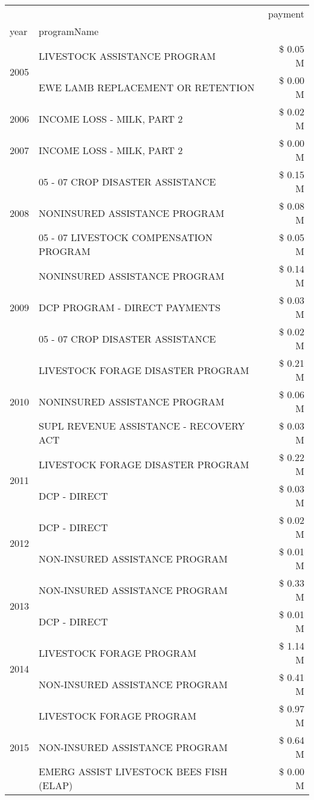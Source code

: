 \begin{tabular}{llr}
\toprule
 &  & payment \\
year & programName &  \\
\midrule
\multirow[t]{2}{*}{2005} & LIVESTOCK ASSISTANCE PROGRAM & \$ 0.05 M \\
 & EWE LAMB REPLACEMENT OR RETENTION & \$ 0.00 M \\
\cline{1-3}
2006 & INCOME LOSS - MILK, PART 2 & \$ 0.02 M \\
\cline{1-3}
2007 & INCOME LOSS - MILK, PART 2 & \$ 0.00 M \\
\cline{1-3}
\multirow[t]{3}{*}{2008} & 05 - 07 CROP DISASTER ASSISTANCE & \$ 0.15 M \\
 & NONINSURED ASSISTANCE PROGRAM & \$ 0.08 M \\
 & 05 - 07 LIVESTOCK COMPENSATION PROGRAM & \$ 0.05 M \\
\cline{1-3}
\multirow[t]{3}{*}{2009} & NONINSURED ASSISTANCE PROGRAM & \$ 0.14 M \\
 & DCP PROGRAM - DIRECT PAYMENTS & \$ 0.03 M \\
 & 05 - 07 CROP DISASTER ASSISTANCE & \$ 0.02 M \\
\cline{1-3}
\multirow[t]{3}{*}{2010} & LIVESTOCK FORAGE DISASTER PROGRAM & \$ 0.21 M \\
 & NONINSURED ASSISTANCE PROGRAM & \$ 0.06 M \\
 & SUPL REVENUE ASSISTANCE - RECOVERY ACT & \$ 0.03 M \\
\cline{1-3}
\multirow[t]{2}{*}{2011} & LIVESTOCK FORAGE DISASTER PROGRAM & \$ 0.22 M \\
 & DCP - DIRECT & \$ 0.03 M \\
\cline{1-3}
\multirow[t]{2}{*}{2012} & DCP - DIRECT & \$ 0.02 M \\
 & NON-INSURED ASSISTANCE PROGRAM & \$ 0.01 M \\
\cline{1-3}
\multirow[t]{2}{*}{2013} & NON-INSURED ASSISTANCE PROGRAM & \$ 0.33 M \\
 & DCP - DIRECT & \$ 0.01 M \\
\cline{1-3}
\multirow[t]{2}{*}{2014} & LIVESTOCK FORAGE PROGRAM & \$ 1.14 M \\
 & NON-INSURED ASSISTANCE PROGRAM & \$ 0.41 M \\
\cline{1-3}
\multirow[t]{3}{*}{2015} & LIVESTOCK FORAGE PROGRAM & \$ 0.97 M \\
 & NON-INSURED ASSISTANCE PROGRAM & \$ 0.64 M \\
 & EMERG ASSIST LIVESTOCK BEES FISH (ELAP) & \$ 0.00 M \\

\end{tabular}
